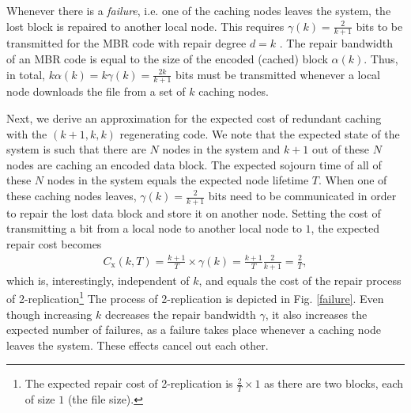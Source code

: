 \documentclass[10pt,conference]{IEEEtran}
\begin{document}
Whenever there is a \emph{failure}, i.e. one of the caching nodes
leaves the system, the lost block is repaired to another local node.
This requires $\gamma(k) = \frac{2}{k+1}$ bits to be transmitted
for the MBR code with repair degree $d=k$ \cite{dima}. The repair
bandwidth of an MBR code is equal to the size of the encoded (cached)
block $\alpha(k)$. Thus, in total, $k\alpha(k) = k\gamma(k) =
\frac{2k}{k+1}$ bits must be transmitted whenever a local node
downloads the file from a set of $k$ caching nodes.

Next, we derive an approximation for the expected cost of redundant
caching with the $(k{+}1,k,k)$ regenerating code. We note that the
expected state of the system is such that there are $N$ nodes in the
system and $k{+}1$ out of these $N$ nodes are caching an encoded data
block. The expected sojourn time of all of these $N$ nodes in the system
equals the expected node lifetime $T$. When one of these caching nodes
leaves, $\gamma(k) = \frac{2}{k+1}$ bits need to be communicated in
order to repair the lost data block and store it on another node. Setting the cost of transmitting a bit from a local node to another local node
to $1$, the expected repair cost becomes
\begin{align}
C_{\text{x}}(k,T) = \frac{k+1}{T} \times \gamma(k) = \frac{k+1}{T} \frac{2}{k+1} = \frac{2}{T},
\label{repaireq}
\end{align}
which is, interestingly, independent of $k$, and equals the cost of
the repair process of 2-replication\footnote{The expected repair cost of 2-replication is $\frac{2}{T} \times 1$ as there are two blocks, each of size $1$ (the file size).} 
The process of 2-replication is depicted in Fig. \ref{failure}. Even
though increasing $k$ decreases the repair bandwidth $\gamma$, it also
increases the expected number of failures, as a failure takes place
whenever a caching node leaves the system. These effects cancel out each other.
\end{document}
